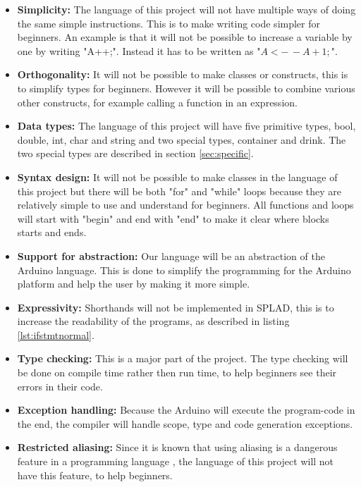 \begin{itemize}

\item \textbf{Simplicity:} The language of this project will not have multiple ways of doing the same simple instructions. This is to make writing code simpler for beginners. An example is that it will not be possible to increase a variable by one by writing "A++;". Instead it has to be written as "$A<-\,-A+1;$".

\item \textbf{Orthogonality:} It will not be possible to make classes or constructs, this is to simplify types for beginners. However it will be possible to combine various other constructs, for example calling a function in an expression. 

\item \textbf{Data types:} The language of this project will have five primitive types, bool, double, int, char and string and two special types, container and drink. The two special types are described in section \ref{sec:specific}.

\item \textbf{Syntax design:} It will not be possible to make classes in the language of this project but there will be both "for" and "while" loops because they are relatively simple to use and understand for beginners. All functions and loops will start with "begin" and end with "end" to make it clear where blocks starts and ends.

\item \textbf{Support for abstraction:} Our language will be an abstraction of the Arduino language. This is done to simplify the programming for the Arduino platform and help the user by making it more simple.

\item \textbf{Expressivity:} Shorthands will not be implemented in SPLAD, this is to increase the readability of the programs, as described in listing \ref{lst:ifstmtnormal}.

\item \textbf{Type checking:} This is a major part of the project. The type checking will be done on compile time rather then run time, to help beginners see their errors in their code.

\item \textbf{Exception handling:} Because the Arduino will execute the program-code in the end, the compiler will handle scope, type and code generation exceptions.

\item \textbf{Restricted aliasing:} Since it is known that using aliasing is a dangerous feature in a programming language \citep{sebesta}, the language of this project will not have this feature, to help beginners.
\end{itemize}
